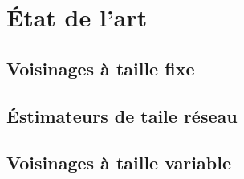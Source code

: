 
\section{État de l'art}

\subsection{Voisinages à taille fixe}

\subsection{Éstimateurs de taile réseau}

\subsection{Voisinages à taille variable}

